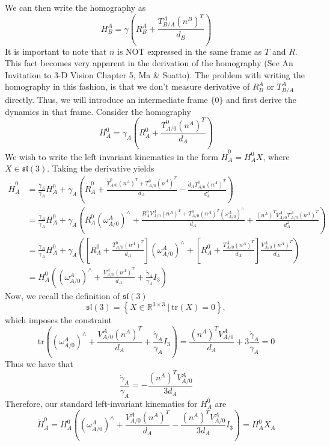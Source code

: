 \documentclass[a4paper]{article}
\begin{document}
We can then write the homography as 
\[
    H_{B}^{A} = \gamma \left( R_{B}^{A} + \frac{T_{B/A}^A (n^B)^T}{d_{B}} \right)
\]
It is important to note that $n$ is NOT expressed in the same frame as $T$ and $R$. This fact becomes very apparent in the derivation of the homography (See An Invitation to 3-D Vision Chapter 5, Ma \& Soatto). The problem with writing the homography in this fashion, is that we don't measure derivative of $R_{B}^A$ or $T_{B/A}^A$ directly. Thus, we will introduce an intermediate frame $\{0\}$ and first derive the dynamics in that frame. Consider the homography 
\[
    H_A^0 = \gamma_A \left( R_A^0 + \frac{T_{A/0}^0(n^A)^T}{d_A} \right)
\]
We wish to write the left invariant kinematics in the form $\dot{H}_A^0 = H_A^0X$, where $X \in \mathfrak{sl}(3)$. Taking the derivative yields
\[
    \begin{aligned}
        \dot{H}_{A}^0 &= \frac{\dot{\gamma}_A}{\gamma_A}H_{A}^0 + \gamma_A \left( \dot{R}_A^0 + \frac{\dot{T}_{A/0}^0 (n^A)^T + T_{A/0}^0(\dot{n}^A)^T}{d_A} - \frac{\dot{d}_AT_{A/0}^0(n^A)^T}{d_A^2}\right) \\
                      &= \frac{\dot{\gamma}_A}{\gamma_A}H_{A}^0 + \gamma_A \left( R_A^0 \left( \omega_{A/0}^A \right)^{\wedge} + \frac{R_{A}^0V_{A/0}^A(n^A)^T + T_{A/0}^0(n^A)^T \left( \omega_{A/0}^A \right)^{\wedge}}{d_A} + \frac{(n^A)^TV_{A/0}^AT_{A/0}^A(n^A)^T}{d_A^2} \right) \\
                      &= \frac{\dot{\gamma}_A}{\gamma_A}H_{A}^0 + \gamma_A \left( \left[ R_{A}^0 + \frac{T_{A/0}^0(n^A)^T}{d_A} \right]\left(\omega_{A/0}^A\right)^{\wedge} + \left[ R_A^0 + \frac{T_{A/0}^A(n^A)^T}{d_A}\right]\frac{V_{A/0}^A(n^A)^T}{d_A} \right) \\
                      &= H_A^0 \left( \left( \omega_{A/0}^A \right)^{\wedge}  +  \frac{V_{A/0}^A(n^A)^T}{d_A} + \frac{\dot{\gamma}_A}{\gamma_A}I_3 \right)
    \end{aligned}
\]
Now, we recall the definition of $\mathfrak{sl}(3)$
\[
    \mathfrak{sl}(3) = \left\{ X \in \mathds{R}^{3 \times 3}\ |\ \text{tr}(X) = 0 \right\},
\]
which imposes the constraint
\[
    \text{tr} \left( \left( \omega_{A/0}^A \right)^{\wedge}  +  \frac{V_{A/0}^A(n^A)^T}{d_A} + \frac{\dot{\gamma}_A}{\gamma_A}I_3 \right) = \frac{(n^A)^TV_{A/0}^A}{d_A} + 3\frac{\dot{\gamma}_A}{\gamma_{A}} = 0
\]
Thus we have that
\[
    \frac{\dot{\gamma}_A}{\gamma_A} = -\frac{(n^A)^TV_{A/0}^A}{3d_A}
\]
Therefore, our standard left-invariant kinematics for $H_A^0$ are
\[
    \dot{H}_A^0 = H_A^0 \left( \left( \omega_{A/0}^A \right)^{\wedge} +  \frac{V_{A/0}^A(n^A)^T}{d_A}-\frac{(n^A)^TV_{A/0}^A}{3d_A}I_3 \right) = H_A^0X_A
\]
\end{document}
